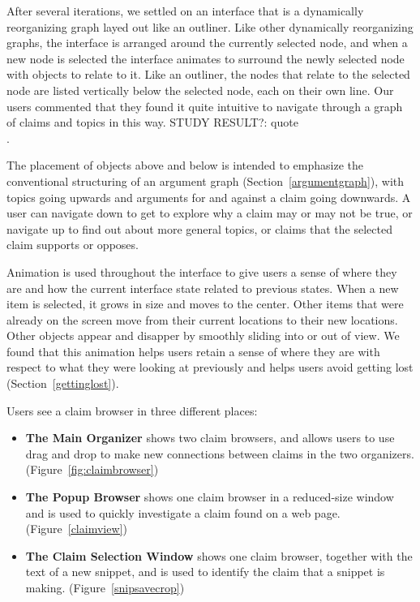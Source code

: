 \documentclass{chi2009}
\newcommand{\todo}[1]{}
\newcommand{\studyresult}[1]{{\color{red} STUDY RESULT?: #1}\\}
\begin{document}
After several iterations, we settled on an interface that is a dynamically reorganizing graph layed out like an outliner. Like other dynamically reorganizing graphs, the interface is arranged around the currently selected node, and when a new node is selected the interface animates to surround the newly selected node with objects to relate to it. Like an outliner, the nodes that relate to the selected node are listed vertically below the selected node, each on their own line. Our users commented that they found it quite intuitive to navigate through a graph of claims and topics in this way. \studyresult{quote}.

The placement of objects above and below is intended to emphasize the conventional structuring of an argument graph (Section~\ref{argumentgraph}), with topics going upwards and arguments for and against a claim going downwards. A user can navigate down to get to explore why a claim may or may not be true, or navigate up to find out about more general topics, or claims that the selected claim supports or opposes.

\todo{Have I seen an interface like this elsewhere? Did PARC have something like this?}

\todo{Is this interface a contribution in itself? Has an interface like this been presented before?}

Animation is used throughout the interface to give users a sense of where they are and how the current interface state related to previous states. When a new item is selected, it grows in size and moves to the center. Other items that were already on the screen move from their current locations to their new locations. Other objects appear and disapper by smoothly sliding into or out of view. We found that this animation helps users retain a sense of where they are with respect to what they were looking at previously and helps users avoid getting lost (Section~\ref{gettinglost}).

Users see a claim browser in three different places:
\begin{itemize}
\item {\bf The Main Organizer} shows two claim browsers, and allows users to use drag and drop to make new connections between claims in the two organizers. (Figure~\ref{fig:claimbrowser})
\item {\bf The Popup Browser} shows one claim browser in a reduced-size window and is used to quickly investigate a claim found on a web page. (Figure~\ref{claimview})
\item {\bf The Claim Selection Window} shows one claim browser, together with the text of a new snippet, and is used to identify the claim that a snippet is making. (Figure~\ref{snipsavecrop}) 
\end{itemize}
\end{document}
